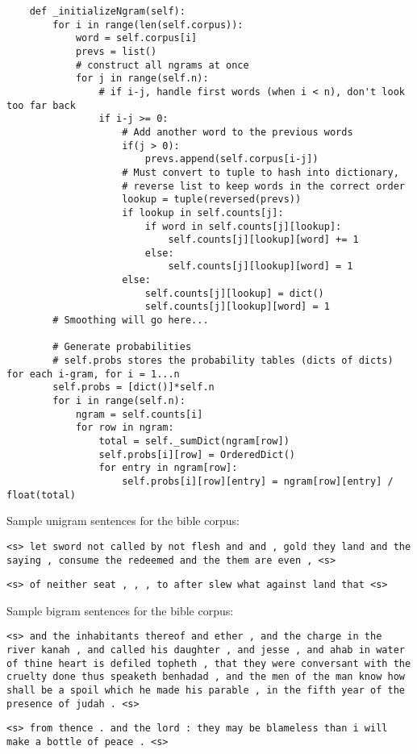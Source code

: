 \documentclass{article}
\begin{document}
{\small
\begin{verbatim}
    def _initializeNgram(self):
        for i in range(len(self.corpus)):
            word = self.corpus[i]
            prevs = list()
            # construct all ngrams at once
            for j in range(self.n):
                # if i-j, handle first words (when i < n), don't look too far back
                if i-j >= 0:
                    # Add another word to the previous words
                    if(j > 0):
                        prevs.append(self.corpus[i-j])
                    # Must convert to tuple to hash into dictionary,
                    # reverse list to keep words in the correct order
                    lookup = tuple(reversed(prevs))
                    if lookup in self.counts[j]:
                        if word in self.counts[j][lookup]:
                            self.counts[j][lookup][word] += 1
                        else:
                            self.counts[j][lookup][word] = 1
                    else:
                        self.counts[j][lookup] = dict()
                        self.counts[j][lookup][word] = 1
        # Smoothing will go here...

        # Generate probabilities
        # self.probs stores the probability tables (dicts of dicts) for each i-gram, for i = 1...n
        self.probs = [dict()]*self.n
        for i in range(self.n):
            ngram = self.counts[i]
            for row in ngram:
                total = self._sumDict(ngram[row])
                self.probs[i][row] = OrderedDict()
                for entry in ngram[row]:
                    self.probs[i][row][entry] = ngram[row][entry] / float(total)
\end{verbatim}}

\newpage
\setlength{\parindent}{0cm}
\newcommand\npar{\par\smallskip}
Sample unigram sentences for the bible corpus:\npar
\texttt{<s> let sword not called by not flesh and and , gold they land and the saying , consume the redeemed and the them are even , <s>}\npar
\texttt{<s> of neither seat , , , to after slew what against land that <s>}\npar\bigskip

Sample bigram sentences for the bible corpus:\npar
\texttt{<s> and the inhabitants thereof and ether , and the charge in the river kanah , and called his daughter , and jesse , and ahab in water of thine heart is defiled topheth , that they were conversant with the cruelty done thus speaketh benhadad , and the men of the man know how shall be a spoil which he made his parable , in the fifth year of the presence of judah . <s>}\npar
\texttt{<s> from thence . and the lord : they may be blameless than i will make a bottle of peace . <s>}\npar\bigskip
\end{document}
